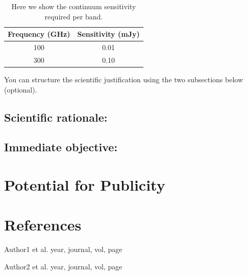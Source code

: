 \documentclass{alma_proposal}
\begin{document}
\begin{table}[tbh]
\begin{center}
\caption[]{Here we show the continuum sensitivity required per band.}
\begin{tabular}{cc}
\hline \noalign {\smallskip}
Frequency (GHz) & Sensitivity (mJy) \\
\hline \noalign {\smallskip}
100 & 0.01 \\
300 & 0.10 \\
\end{tabular}
\end{center}
\end{table}

You can structure the scientific justification using the two subsections below (optional).

\subsection{Scientific rationale:}


\subsection{Immediate objective:}



\section{Potential for Publicity}




\section{References}


\noindent [1] Author1 et al. year, journal, vol, page

\noindent [2] Author2 et al. year, journal, vol, page


\end{document}
